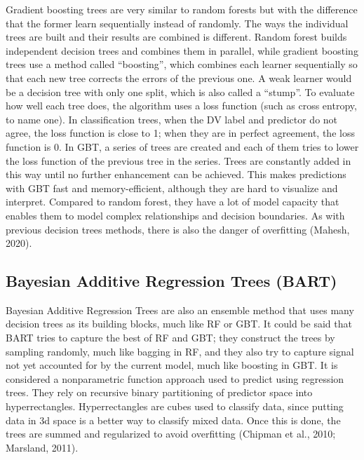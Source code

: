 \documentclass[
  man]{apa7}
\begin{document}
Gradient boosting trees are very similar to random forests but with the difference that the former learn sequentially instead of randomly.
The ways the individual trees are built and their results are combined is different.
Random forest builds independent decision trees and combines them in parallel, while gradient boosting trees use a method called ``boosting'', which combines each learner sequentially so that each new tree corrects the errors of the previous one.
A weak learner would be a decision tree with only one split, which is also called a ``stump''.
To evaluate how well each tree does, the algorithm uses a loss function (such as cross entropy, to name one).
In classification trees, when the DV label and predictor do not agree, the loss function is close to 1; when they are in perfect agreement, the loss function is 0.
In GBT, a series of trees are created and each of them tries to lower the loss function of the previous tree in the series.
Trees are constantly added in this way until no further enhancement can be achieved.
This makes predictions with GBT fast and memory-efficient, although they are hard to visualize and interpret.
Compared to random forest, they have a lot of model capacity that enables them to model complex relationships and decision boundaries.
As with previous decision trees methods, there is also the danger of overfitting (Mahesh, 2020).

\hypertarget{bayesian-additive-regression-trees-bart}{%
\subsection{Bayesian Additive Regression Trees (BART)}\label{bayesian-additive-regression-trees-bart}}

Bayesian Additive Regression Trees are also an ensemble method that uses many decision trees as its building blocks, much like RF or GBT.
It could be said that BART tries to capture the best of RF and GBT; they construct the trees by sampling randomly, much like bagging in RF, and they also try to capture signal not yet accounted for by the current model, much like boosting in GBT.
It is considered a nonparametric function approach used to predict using regression trees.
They rely on recursive binary partitioning of predictor space into hyperrectangles.
Hyperrectangles are cubes used to classify data, since putting data in 3d space is a better way to classify mixed data.
Once this is done, the trees are summed and regularized to avoid overfitting (Chipman et al., 2010; Marsland, 2011).
\end{document}
